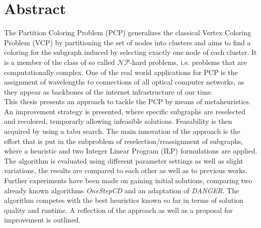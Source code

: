 \chapter*{Abstract}

The Partition Coloring Problem (PCP) generalizes the classical Vertex Coloring Problem (VCP) by partitioning the set of nodes into clusters and aims to find a coloring for the subgraph induced by selecting exactly one node of each cluster. It is a member of the class of so called $\mathcal{NP}$-hard problems, i.e. problems that are computationally complex. One of the real world applications for PCP is the assignment of wavelengths to connections of all optical computer networks, as they appear as backbones of the internet infrastructure of our time.\\

This thesis presents an approach to tackle the PCP by means of metaheuristics. An improvement strategy is presented, where specific subgraphs are reselected and recolored, temporarly allowing infeasible solutions. Feasability is then acquired by using a tabu search. The main innovation of the approach is the effort that is put in the subproblem of reselection/reassignment of subgraphs, where a heuristic and two  Integer Linear Program (ILP) formulations are applied. The algorithm is evaluated using different parameter settings as well as slight variations, the results are compared to each other as well as to previous works. Further experiments have been made on gaining initial solutions, comparing two already known algorithms \textit{OneStepCD} and an adaptation of \textit{DANGER}. The algorithm competes with the best heuristics known so far in terms of solution quality and runtime. A reflection of the approach as well as a proposal for improvement is outlined.
